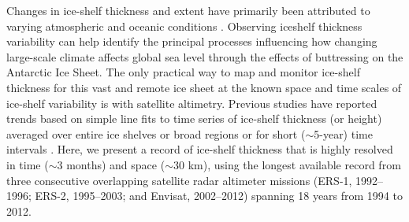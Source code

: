 Changes in ice-shelf thickness and extent have primarily been attributed to
varying atmospheric and oceanic conditions \parencite{Scambos2003a, Dutrieux2014}.
Observing iceshelf thickness variability can help identify the principal 
processes influencing how changing large-scale climate affects global sea level
through the effects of buttressing on the Antarctic Ice Sheet. The only
practical way to map and monitor ice-shelf thickness for this vast and remote
ice sheet at the known space and time scales of ice-shelf variability is with
satellite altimetry. Previous studies have reported trends based on simple line
fits to time series of ice-shelf thickness (or height) averaged over entire ice
shelves or broad regions \parencite{Shepherd2010, Zwally2005} or for short 
($\sim$5-year) time intervals \parencite{Pritchard2012, Rignot2013,Depoorter2013}.
Here, we present a record of ice-shelf thickness that is highly resolved in 
time ($\sim$3 months) and space ($\sim$30 km), using the longest available 
record from three consecutive overlapping satellite radar altimeter missions
(ERS-1, 1992--1996; ERS-2, 1995--2003; and Envisat, 2002--2012) spanning 18
years from 1994 to 2012.

